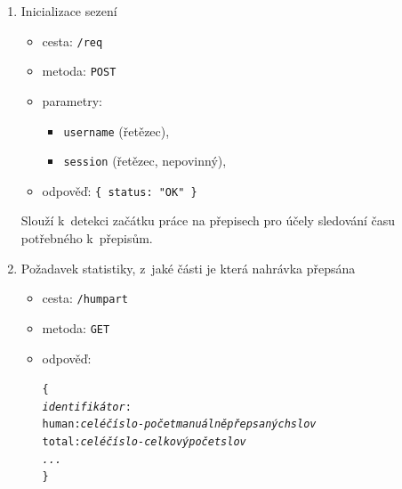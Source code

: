 \begin{enumerate}
{    Verze se inkrementuje při každém příspěvku. Slouží k~tomu, aby se mohly cachovat
    přepisy, ale aby se cache nepoužila, pokud někdo přepis změnil.
}
\item{
    Inicializace sezení
    \begin{itemize}
      \item{cesta: \texttt{/req}}
      \item{metoda: \texttt{POST}}
      \item{parametry:
        \begin{itemize}
          \item{\texttt{username} (řetězec),}
          \item{\texttt{session} (řetězec, nepovinný),}
        \end{itemize}
      }
      \item{odpověď: \texttt{\{ status: "OK" \}}}
    \end{itemize}

    Slouží k~detekci začátku práce na přepisech pro účely sledování času
    potřebného k~přepisům.
}
\item{
    Požadavek statistiky, z~jaké části je která nahrávka přepsána
    \begin{itemize}
      \item{cesta: \texttt{/humpart}}
      \item{metoda: \texttt{GET}}
      \item{odpověď: \begin{alltt}\{
  {\em identifikátor}:
      human:{\em celé číslo - počet manuálně přepsaných slov}
      total:{\em celé číslo - celkový počet slov}
  {\em ...}
\}\end{alltt}
      }
    \end{itemize}

}
\end{enumerate}
